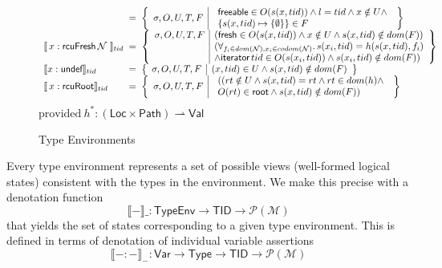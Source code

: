 \begin{figure}
\[\begin{array}{l@{\;\;=\;\;}l}
&
\left\{
\begin{array}{l|l}
\sigma,O,U,T,F
&\begin{array}{l}\textsf{freeable}\in  O(s(x,tid)) \land l = tid \land x \notin U \land \\
\{ s(x,tid) \mapsto \{\emptyset\}\} \in F \end{array}
\end{array}
\right\}
\\
\llbracket \, x : \textsf{rcuFresh} \, \N \, \,  \rrbracket_{tid}
&
\left\{
\begin{array}{l|l}
\sigma,O,U,T,F
&(\textsf{fresh}\in  O(s(x,tid)) \land x \notin U  \land s(x,tid) \notin dom(F))\\
&(\forall_{f_i\in dom(\N), x_i\in codom(\N) } \ldotp s(x_i,tid) = h(s(x,tid), f_i) \\
&\land \textsf{iterator}\,tid \in O(s(x_i,tid)) \land s(x_i,tid) \notin dom(F)) 
\end{array}
\right\}
\\
\llbracket  x : \textsf{undef}\rrbracket_{tid} 
&
\left\{
\begin{array}{l|l}
\sigma,O,U,T,F
&
(x,tid) \in U \land s(x,tid) \notin dom(F)
\end{array}
\right\}
\\
\llbracket \, x : \textsf{rcuRoot}\rrbracket_{tid}
&
\left\{
\begin{array}{l|l}
\sigma,O,U,T,F
& \begin{array}{l}((rt \notin U \land s(x,tid) = rt \land rt \in dom(h) \land \\ 
O(rt) \in \textsf{root} \land s(x,tid) \notin dom(F) ) \end{array}
\end{array}
\right\}
\end{array}
\]
$
\textrm{provided}~h^{*}: (\textsf{Loc} \times \textsf{Path}) \rightharpoonup \textsf{Val}
$
\caption{Type Environments}
\label{fig:denotingtypeenviroment}
\vspace{-2mm}
\end{figure}

Every type environment represents a set of possible views (well-formed logical states) consistent with the types in the environment.  We make this precise with a denotation function
\[\llbracket-\rrbracket\_ : \mathsf{TypeEnv}\rightarrow\mathsf{TID}\rightarrow\mathcal{P}(\mathcal{M})\]
that yields the set of states corresponding to a given type environment. This is defined in terms of denotation of individual variable assertions
\[\llbracket-:-\rrbracket_- : \mathsf{Var}\rightarrow\mathsf{Type}\rightarrow\mathsf{TID}\rightarrow\mathcal{P}(\mathcal{M})\]

